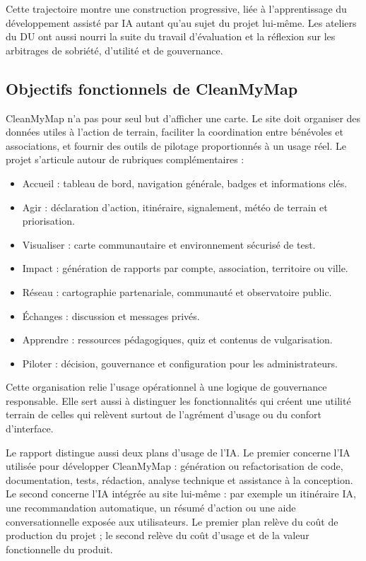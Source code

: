 \documentclass[
  10pt,
  a4paper,
  DIV=11,
  numbers=noendperiod,
  oneside]{scrreprt}
\providecommand{\tightlist}{%
  \setlength{\itemsep}{0pt}\setlength{\parskip}{0pt}}
\begin{document}
Cette trajectoire montre une construction progressive, liée à
l'apprentissage du développement assisté par IA autant qu'au sujet du
projet lui-même. Les ateliers du DU ont aussi nourri la suite du travail
d'évaluation et la réflexion sur les arbitrages de sobriété, d'utilité
et de gouvernance.

\subsection{Objectifs fonctionnels de
CleanMyMap}\label{objectifs-fonctionnels-de-cleanmymap}

CleanMyMap n'a pas pour seul but d'afficher une carte. Le site doit
organiser des données utiles à l'action de terrain, faciliter la
coordination entre bénévoles et associations, et fournir des outils de
pilotage proportionnés à un usage réel. Le projet s'articule autour de
rubriques complémentaires :

\begin{itemize}
\tightlist
\item
  Accueil : tableau de bord, navigation générale, badges et informations
  clés.
\item
  Agir : déclaration d'action, itinéraire, signalement, météo de terrain
  et priorisation.
\item
  Visualiser : carte communautaire et environnement sécurisé de test.
\item
  Impact : génération de rapports par compte, association, territoire ou
  ville.
\item
  Réseau : cartographie partenariale, communauté et observatoire public.
\item
  Échanges : discussion et messages privés.
\item
  Apprendre : ressources pédagogiques, quiz et contenus de
  vulgarisation.
\item
  Piloter : décision, gouvernance et configuration pour les
  administrateurs.
\end{itemize}

Cette organisation relie l'usage opérationnel à une logique de
gouvernance responsable. Elle sert aussi à distinguer les
fonctionnalités qui créent une utilité terrain de celles qui relèvent
surtout de l'agrément d'usage ou du confort d'interface.

Le rapport distingue aussi deux plans d'usage de l'IA. Le premier
concerne l'IA utilisée pour développer CleanMyMap : génération ou
refactorisation de code, documentation, tests, rédaction, analyse
technique et assistance à la conception. Le second concerne l'IA
intégrée au site lui-même : par exemple un itinéraire IA, une
recommandation automatique, un résumé d'action ou une aide
conversationnelle exposée aux utilisateurs. Le premier plan relève du
coût de production du projet ; le second relève du coût d'usage et de la
valeur fonctionnelle du produit.
\end{document}
